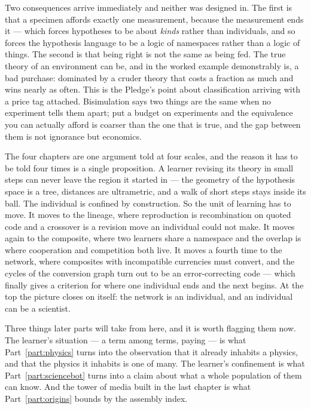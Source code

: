 \documentclass[12pt,openright,twoside]{book}
\theoremstyle{remark}
\theoremstyle{plain}
\theoremstyle{remark}
\theoremstyle{plain}
\theoremstyle{plain}
\begin{document}
Two consequences arrive immediately and neither was designed in.
The first is that a specimen affords exactly one measurement, because the
measurement ends it --- which forces hypotheses to be about \emph{kinds}
rather than individuals, and so forces the hypothesis language to be a
logic of namespaces rather than a logic of things.
The second is that being right is not the same as being fed.
The true theory of an environment can be, and in the worked example
demonstrably is, a bad purchase: dominated by a cruder theory that costs a
fraction as much and wins nearly as often.
This is the Pledge's point about classification arriving with a price tag
attached.
Bisimulation says two things are the same when no experiment tells them
apart; put a budget on experiments and the equivalence you can actually
afford is coarser than the one that is true, and the gap between them is
not ignorance but economics.

The four chapters are one argument told at four scales, and the reason it
has to be told four times is a single proposition.
A learner revising its theory in small steps can never leave the region it
started in --- the geometry of the hypothesis space is a tree, distances are
ultrametric, and a walk of short steps stays inside its ball.
The individual is confined by construction.
So the unit of learning has to move.
It moves to the lineage, where reproduction is recombination on quoted code
and a crossover is a revision move an individual could not make.
It moves again to the composite, where two learners share a namespace and
the overlap is where cooperation and competition both live.
It moves a fourth time to the network, where composites with incompatible
currencies must convert, and the cycles of the conversion graph turn out to
be an error-correcting code --- which finally gives a criterion for where one
individual ends and the next begins.
At the top the picture closes on itself: the network is an individual, and
an individual can be a scientist.

Three things later parts will take from here, and it is worth flagging
them now.
The learner's situation --- a term among terms, paying --- is what
Part~\ref{part:physics} turns into the observation that it already
inhabits a physics, and that the physics it inhabits is one of many.
The learner's confinement is what Part~\ref{part:sciencebot} turns into a
claim about what a whole population of them can know.
And the tower of media built in the last chapter is what
Part~\ref{part:origins} bounds by the assembly index.
\end{document}
